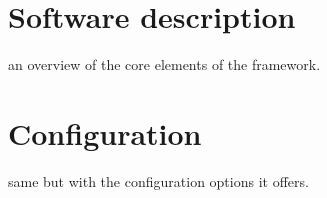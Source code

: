 

\section{Software description}\label{sec:framework-software}
an overview of the core elements of the framework.





\section{Configuration}\label{sec:framework-configuration}
same but with the configuration options it offers.

